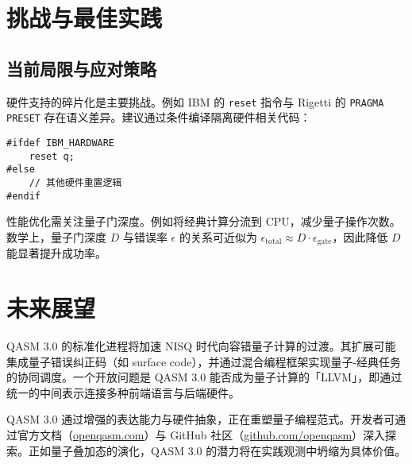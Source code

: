 \chapter{挑战与最佳实践}
\section{当前局限与应对策略}
硬件支持的碎片化是主要挑战。例如 IBM 的 \verb!reset! 指令与 Rigetti 的 \verb!PRAGMA PRESET! 存在语义差异。建议通过条件编译隔离硬件相关代码：\par
\begin{lstlisting}[language=qasm]
#ifdef IBM_HARDWARE
    reset q;
#else
    // 其他硬件重置逻辑
#endif
\end{lstlisting}
性能优化需关注量子门深度。例如将经典计算分流到 CPU，减少量子操作次数。数学上，量子门深度 $D$ 与错误率 $\epsilon$ 的关系可近似为 $\epsilon_{\text{total}} \approx D \cdot \epsilon_{\text{gate}}$，因此降低 $D$ 能显著提升成功率。\par
\chapter{未来展望}
QASM 3.0 的标准化进程将加速 NISQ 时代向容错量子计算的过渡。其扩展可能集成量子错误纠正码（如 surface code），并通过混合编程框架实现量子-经典任务的协同调度。一个开放问题是 QASM 3.0 能否成为量子计算的「LLVM」，即通过统一的中间表示连接多种前端语言与后端硬件。\par
QASM 3.0 通过增强的表达能力与硬件抽象，正在重塑量子编程范式。开发者可通过官方文档（\href{https://openqasm.com}{openqasm.com}）与 GitHub 社区（\href{https://github.com/openqasm}{github.com/openqasm}）深入探索。正如量子叠加态的演化，QASM 3.0 的潜力将在实践观测中坍缩为具体价值。\par
